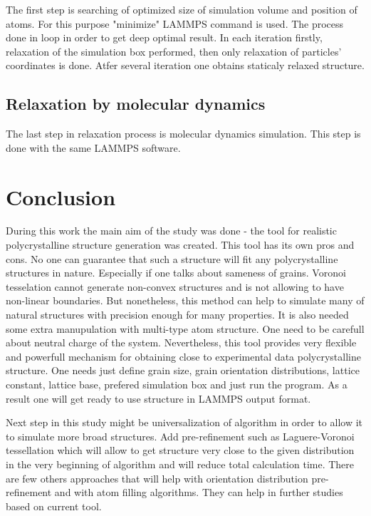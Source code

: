\documentclass[12pt]{report}
\begin{document}
The first step is searching of optimized size of simulation volume and position of atoms. For this purpose "minimize" LAMMPS command is used. The process done in loop in order to get deep optimal result. In each iteration firstly, relaxation of the simulation box performed, then only relaxation of particles' coordinates is done. Atfer several iteration one obtains staticaly relaxed structure.

\subsection{Relaxation by molecular dynamics}

The last step in relaxation process is molecular dynamics simulation. This step is done with the same LAMMPS software. 

\section{Conclusion}

During this work the main aim of the study was done - the tool for realistic polycrystalline structure generation was created. This tool has its own pros and cons. No one can guarantee that such a structure will fit any polycrystalline structures in nature. Especially if one talks about sameness of grains. Voronoi tesselation cannot generate non-convex structures and is not allowing to have non-linear boundaries. But nonetheless, this method can help to simulate many of natural structures with precision enough for many properties. It is also needed some extra manupulation with multi-type atom structure. One need to be carefull about neutral charge of the system. Nevertheless, this tool provides very flexible and powerfull mechanism for obtaining close to experimental data polycrystalline structure. One needs just define grain size, grain orientation distributions, lattice constant, lattice base, prefered simulation box and just run the program. As a result one will get ready to use structure in LAMMPS output format.

Next step in this study might be universalization of algorithm in order to allow it to simulate more broad structures. Add pre-refinement such as Laguere-Voronoi tessellation which will allow to get structure very close to the given distribution in the very beginning of algorithm and will reduce total calculation time. There are few others approaches that will help with orientation distribution pre-refinement and with atom filling algorithms. They can help in further studies based on current tool.
\end{document}
